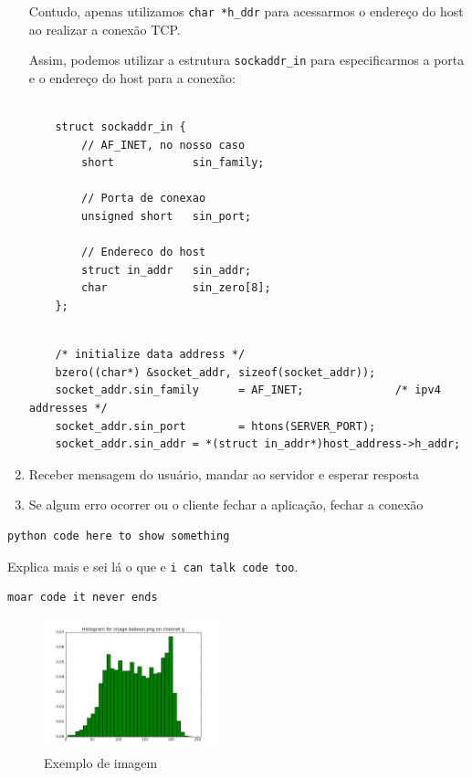 \documentclass[10pt,twocolumn,letterpaper]{article}
\begin{document}
\begin{enumerate}
	Contudo, apenas utilizamos \texttt{char *h\_ddr} para acessarmos o endereço do host ao realizar a conexão TCP.

	Assim, podemos utilizar a estrutura \texttt{sockaddr\_in} para especificarmos a porta e o endereço do host para a conexão:

	\begin{lstlisting}[caption={Struct sockaddr\_in}, label=Algorithm]
    
	struct sockaddr_in {
		// AF_INET, no nosso caso
	    short            sin_family;

	    // Porta de conexao
	    unsigned short   sin_port;

	    // Endereco do host
	    struct in_addr   sin_addr;
	    char             sin_zero[8];
	};

	\end{lstlisting}

	\begin{lstlisting}[caption={Implementação no Projeto}, label=Algorithm]
    
	/* initialize data address */
    bzero((char*) &socket_addr, sizeof(socket_addr));
    socket_addr.sin_family      = AF_INET;              /* ipv4 addresses */
    socket_addr.sin_port        = htons(SERVER_PORT);
    socket_addr.sin_addr = *(struct in_addr*)host_address->h_addr;

	\end{lstlisting}


	\item Receber mensagem do usuário, mandar ao servidor e esperar resposta
	\item Se algum erro ocorrer ou o cliente fechar a aplicação, fechar a conexão
 \end{enumerate}



\begin{lstlisting}[caption={Conexão do cliente com o endereço do servidor}, label=Algorithm]
python code here to show something
\end{lstlisting}

Explica mais e sei lá o que e \texttt{i can talk code too}.

\begin{lstlisting}[caption={descreva aqui}, label=Algorithm]
moar code it never ends
\end{lstlisting}

\begin{figure}[!h]
\begin{center}
    \includegraphics[width=0.45\textwidth]{img/sample.png}
    \caption{Exemplo de imagem}   
\end{center} 
\end{figure}
\end{document}
